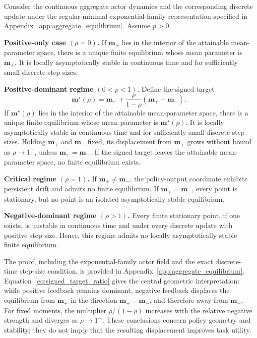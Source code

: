 \begin{theorem}
\label{thm:aggregate_equilibria}
Consider the continuous aggregate actor dynamics and the corresponding
discrete update under the regular minimal exponential-family
representation specified in
Appendix~\ref{app:aggregate_equilibrium}. Assume \(p>0\).

\textbf{Positive-only case \((\rho=0)\).}
If \(\mathbf m_+\) lies in the interior of the attainable mean-parameter
space, there is a unique finite equilibrium whose mean parameter is
\(\mathbf m_+\). It is locally asymptotically stable in continuous time
and for sufficiently small discrete step sizes.

\textbf{Positive-dominant regime \((0<\rho<1)\).}
Define the signed target
\begin{equation}
    \mathbf m^\star(\rho)
    =
    \mathbf m_+
    +
    \frac{\rho}{1-\rho}
    \left(
        \mathbf m_+-\mathbf m_-
    \right).
    \label{eq:signed_target_ratio}
\end{equation}
If \(\mathbf m^\star(\rho)\) lies in the interior of the attainable
mean-parameter space, there is a unique finite equilibrium whose mean
parameter is \(\mathbf m^\star(\rho)\). It is locally asymptotically
stable in continuous time and for sufficiently small discrete step
sizes. Holding \(\mathbf m_+\) and \(\mathbf m_-\) fixed, its displacement
from \(\mathbf m_+\) grows without bound as \(\rho\to1^-\), unless
\(\mathbf m_+=\mathbf m_-\). If the signed target leaves the attainable
mean-parameter space, no finite equilibrium exists.

\textbf{Critical regime \((\rho=1)\).}
If \(\mathbf m_+\neq\mathbf m_-\), the policy-output coordinate exhibits
persistent drift and admits no finite equilibrium. If
\(\mathbf m_+=\mathbf m_-\), every point is stationary, but no point is
an isolated asymptotically stable equilibrium.

\textbf{Negative-dominant regime \((\rho>1)\).}
Every finite stationary point, if one exists, is unstable in continuous
time and under every discrete update with positive step size. Hence,
this regime admits no locally asymptotically stable finite equilibrium.
\end{theorem}

The proof, including the exponential-family actor field and the exact
discrete-time step-size condition, is provided in
Appendix~\ref{app:aggregate_equilibrium}.
Equation~\eqref{eq:signed_target_ratio} gives the central geometric
interpretation: while positive feedback remains dominant, negative
feedback displaces the equilibrium from \(\mathbf m_+\) in the direction
\(\mathbf m_+-\mathbf m_-\), and therefore away from
\(\mathbf m_-\). For fixed moments, the multiplier
\(\rho/(1-\rho)\) increases with the relative negative strength and
diverges as \(\rho\to1^-\). These conclusions concern policy geometry
and stability; they do not imply that the resulting displacement
improves task utility.

